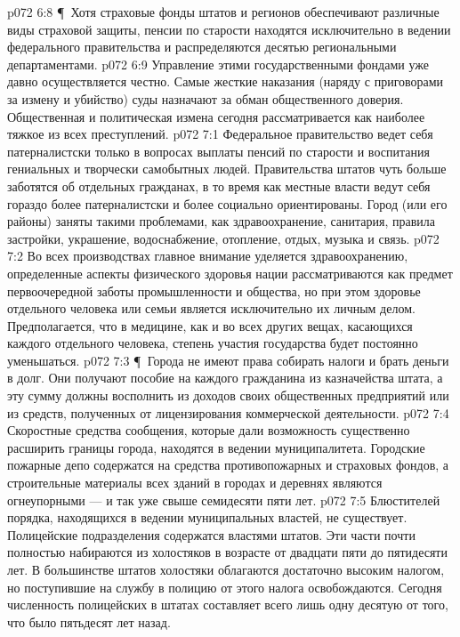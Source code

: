 \vs p072 6:8 \P\ Хотя страховые фонды штатов и регионов обеспечивают различные виды страховой защиты, пенсии по старости находятся исключительно в ведении федерального правительства и распределяются десятью региональными департаментами.
\vs p072 6:9 Управление этими государственными фондами уже давно осуществляется честно. Самые жесткие наказания (наряду с приговорами за измену и убийство) суды назначают за обман общественного доверия. Общественная и политическая измена сегодня рассматривается как наиболее тяжкое из всех преступлений.
\vs p072 7:1 Федеральное правительство ведет себя патерналистски только в вопросах выплаты пенсий по старости и воспитания гениальных и творчески самобытных людей. Правительства штатов чуть больше заботятся об отдельных гражданах, в то время как местные власти ведут себя гораздо более патерналистски и более социально ориентированы. Город (или его районы) заняты такими проблемами, как здравоохранение, санитария, правила застройки, украшение, водоснабжение, отопление, отдых, музыка и связь.
\vs p072 7:2 Во всех производствах главное внимание уделяется здравоохранению, определенные аспекты физического здоровья нации рассматриваются как предмет первоочередной заботы промышленности и общества, но при этом здоровье отдельного человека или семьи является исключительно их личным делом. Предполагается, что в медицине, как и во всех других вещах, касающихся каждого отдельного человека, степень участия государства будет постоянно уменьшаться.
\vs p072 7:3 \P\ Города не имеют права собирать налоги и брать деньги в долг. Они получают пособие на каждого гражданина из казначейства штата, а эту сумму должны восполнить из доходов своих общественных предприятий или из средств, полученных от лицензирования коммерческой деятельности.
\vs p072 7:4 Скоростные средства сообщения, которые дали возможность существенно расширить границы города, находятся в ведении муниципалитета. Городские пожарные депо содержатся на средства противопожарных и страховых фондов, а строительные материалы всех зданий в городах и деревнях являются огнеупорными --- и так уже свыше семидесяти пяти лет.
\vs p072 7:5 Блюстителей порядка, находящихся в ведении муниципальных властей, не существует. Полицейские подразделения содержатся властями штатов. Эти части почти полностью набираются из холостяков в возрасте от двадцати пяти до пятидесяти лет. В большинстве штатов холостяки облагаются достаточно высоким налогом, но поступившие на службу в полицию от этого налога освобождаются. Сегодня численность полицейских в штатах составляет всего лишь одну десятую от того, что было пятьдесят лет назад.
